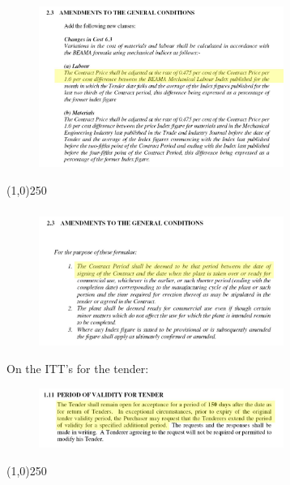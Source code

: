 \begin{frame}
\frametitle{}

\begin{figure}
	\centering
		\includegraphics[width = 8cm]{images/conammend.jpg}
	\label{fig:conammend}
\end{figure}

\end{frame}
\begin{center}\line(1,0){250}\end{center}






\begin{frame}
\frametitle{}
\begin{figure}
	\centering
		\includegraphics[width = 8cm]{images/conammend2.jpg}
	\label{fig:conammend2}
\end{figure}
On the ITT’s for the tender:
\begin{figure}
	\centering
		\includegraphics[width = 8cm]{images/convalid.jpg}
	\label{fig:convalid}
\end{figure}
\end{frame}
\begin{center}\line(1,0){250}\end{center}






